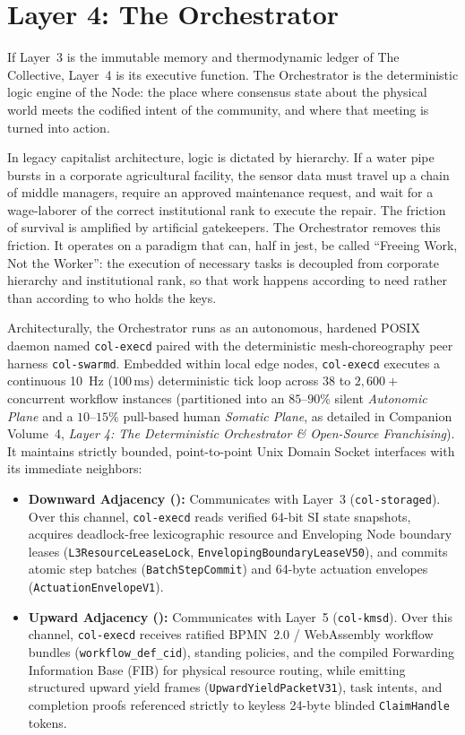 \chapter{Layer 4: The Orchestrator}

If Layer~3 is the immutable memory and thermodynamic ledger of The Collective, Layer~4 is its executive function. The Orchestrator is the deterministic logic engine of the Node: the place where consensus state about the physical world meets the codified intent of the community, and where that meeting is turned into action.

In legacy capitalist architecture, logic is dictated by hierarchy. If a water pipe bursts in a corporate agricultural facility, the sensor data must travel up a chain of middle managers, require an approved maintenance request, and wait for a wage-laborer of the correct institutional rank to execute the repair. The friction of survival is amplified by artificial gatekeepers. The Orchestrator removes this friction. It operates on a paradigm that can, half in jest, be called ``Freeing Work, Not the Worker'': the execution of necessary tasks is decoupled from corporate hierarchy and institutional rank, so that work happens according to need rather than according to who holds the keys.

Architecturally, the Orchestrator runs as an autonomous, hardened POSIX daemon named \texttt{col-execd} paired with the deterministic mesh-choreography peer harness \texttt{col-swarmd}. Embedded within local edge nodes, \texttt{col-execd} executes a continuous 10~Hz ($100\,\mathrm{ms}$) deterministic tick loop across $38$ to $2{,}600+$ concurrent workflow instances (partitioned into an $85\text{--}90\%$ silent \textit{Autonomic Plane} and a $10\text{--}15\%$ pull-based human \textit{Somatic Plane}, as detailed in Companion Volume~4, \textit{Layer 4: The Deterministic Orchestrator \& Open-Source Franchising}). It maintains strictly bounded, point-to-point Unix Domain Socket interfaces with its immediate neighbors:
\begin{itemize}
  \item \textbf{Downward Adjacency ():} Communicates with Layer~3 (\texttt{col-storaged}). Over this channel, \texttt{col-execd} reads verified 64-bit SI state snapshots, acquires deadlock-free lexicographic resource and Enveloping Node boundary leases (\texttt{L3ResourceLeaseLock}, \texttt{EnvelopingBoundaryLeaseV50}), and commits atomic step batches (\texttt{BatchStepCommit}) and 64-byte actuation envelopes (\texttt{ActuationEnvelopeV1}).
  \item \textbf{Upward Adjacency ():} Communicates with Layer~5 (\texttt{col-kmsd}). Over this channel, \texttt{col-execd} receives ratified BPMN~2.0 / WebAssembly workflow bundles (\texttt{workflow\_def\_cid}), standing policies, and the compiled Forwarding Information Base (FIB) for physical resource routing, while emitting structured upward yield frames (\texttt{UpwardYieldPacketV31}), task intents, and completion proofs referenced strictly to keyless 24-byte blinded \texttt{ClaimHandle} tokens.
\end{itemize}

